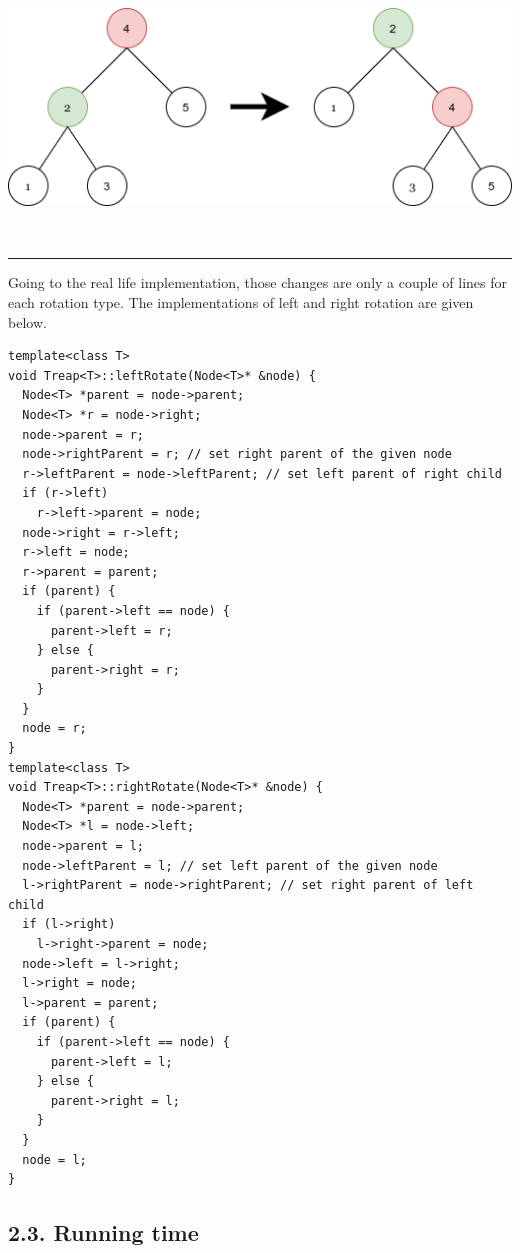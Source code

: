 \documentclass[12pt,english,]{article}
\let\origfigure\figure
\let\endorigfigure\endfigure
\renewenvironment{figure}[1][2] {
    \expandafter\origfigure\expandafter[H]
} {
    \endorigfigure
}
\begin{document}
\begin{figure}
\centering
\vspace{1mm}
\includegraphics[height=0.3\textwidth]{TreeRotation.png}
\caption{\label{fig2:figs}Visualization of right rotation at node 4. The colored nodes are ones has their \textit{left parent} or \textit{right parent} changed. The \textit{right parent} of node 2, the left child of 4, changed to the \textit{right parent} of 4, and \textit{left parent} of node 4 changed to 2. Left rotation is identical.}

\  
\hrule
\end{figure}

Going to the real life implementation, those changes are only a couple
of lines for each rotation type. The implementations of left and right
rotation are given below.

\begin{lstlisting}
template<class T>
void Treap<T>::leftRotate(Node<T>* &node) {
  Node<T> *parent = node->parent;
  Node<T> *r = node->right;
  node->parent = r;
  node->rightParent = r; // set right parent of the given node
  r->leftParent = node->leftParent; // set left parent of right child 
  if (r->left)
    r->left->parent = node;
  node->right = r->left;
  r->left = node;
  r->parent = parent;
  if (parent) {
    if (parent->left == node) {
      parent->left = r;
    } else {
      parent->right = r;
    }
  }
  node = r;
}
template<class T>
void Treap<T>::rightRotate(Node<T>* &node) {
  Node<T> *parent = node->parent;
  Node<T> *l = node->left;
  node->parent = l;
  node->leftParent = l; // set left parent of the given node
  l->rightParent = node->rightParent; // set right parent of left child 
  if (l->right)
    l->right->parent = node;
  node->left = l->right;
  l->right = node;
  l->parent = parent;
  if (parent) {
    if (parent->left == node) {
      parent->left = l;
    } else {
      parent->right = l;
    }
  }
  node = l;
}
\end{lstlisting}
\vspace{-8mm}

\hypertarget{section2.3}{%
\subsection{2.3. Running time}\label{section2.3}}
\end{document}
